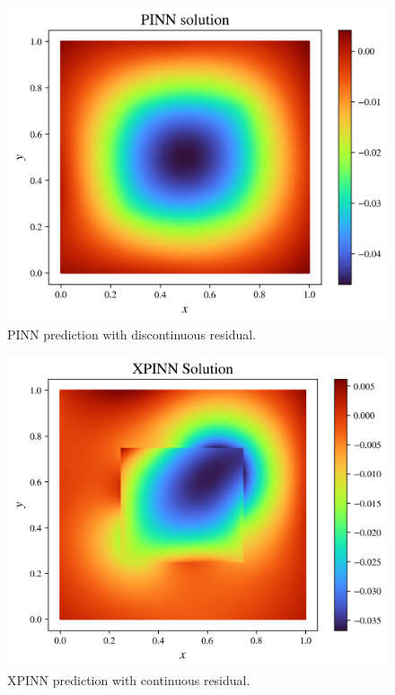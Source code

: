 \begin{figure}[h]
    \centering
    \includegraphics[width=\linewidth]{Project1XPINNs/figures/Poisson/discrete_single_Poisson_solution.pdf.png}
    \caption{PINN prediction with discontinuous residual.}
    \label{fig:pinn_disc_pred}
\end{figure}

\begin{figure}[h]
    \centering
    \includegraphics[width=\linewidth]{Project1XPINNs/figures/Poisson/new_exp/discrete_xpinn_Poisson_solution.png}
    \caption{XPINN prediction with continuous residual.}
    \label{fig:xpinn_disc_pred}
\end{figure}

